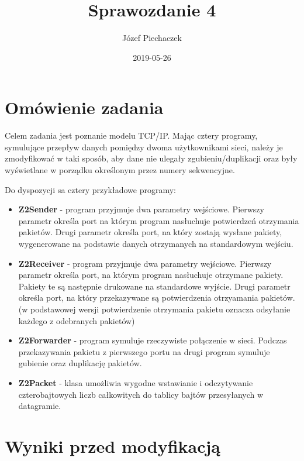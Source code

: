 \documentclass[12pt]{article}
\title{Sprawozdanie 4}
\date{2019-05-26}
\author{Józef Piechaczek}
\begin{document}
\maketitle
\newpage
{}

\section{Omówienie zadania}
Celem zadania jest poznanie modelu TCP/IP. Mając cztery programy, symulujące przepływ danych pomiędzy dwoma użytkownikami sieci, należy je zmodyfikować w taki sposób, aby dane nie ulegały zgubieniu/duplikacji oraz były wyświetlane w porządku określonym przez numery sekwencyjne.

Do dyspozycji sa cztery przykładowe programy:
\begin{itemize}
\itemsep0em
\item \textbf{Z2Sender} - program przyjmuje dwa parametry wejściowe. Pierwszy parametr określa port na którym program nasłuchuje potwierdzeń otrzymania pakietów. Drugi parametr określa port, na który zostają wysłane pakiety, wygenerowane na podstawie danych otrzymanych na standardowym wejściu.
\item \textbf{Z2Receiver} - program przyjmuje dwa parametry wejściowe. Pierwszy parametr określa port, na którym program nasłuchuje otrzymane pakiety. Pakiety te są następnie drukowane na standardowe wyjście. Drugi parametr określa port, na który przekazywane są potwierdzenia otrzyamania pakietów. (w podstawowej wersji potwierdzenie otrzymania pakietu oznacza odsyłanie każdego z odebranych pakietów)
\item \textbf{Z2Forwarder} - program symuluje rzeczywiste połączenie w sieci. Podczas przekazywania pakietu z pierwszego portu na drugi program symuluje gubienie oraz duplikację pakietów.
\item \textbf{Z2Packet} - klasa umożliwia wygodne wstawianie i odczytywanie czterobajtowych liczb całkowitych do tablicy bajtów przesyłanych w datagramie.
\end{itemize}

\newpage
\section{Wyniki przed modyfikacją}
\end{document}
